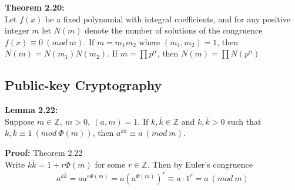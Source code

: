 \documentclass[a4paper]{article}
\begin{document}
\textbf{Theorem 2.20:}\\
Let $f(x)$ be a fixed polynomial with integral coefficients, and for any positive integer $m$ let $N(m)$ denote the number of solutions of the congruence $f(x)\equiv0\ (mod\ m)$. If $m=m_1m_2$ where $(m_1,m_2)=1$, then $N(m)=N(m_1)N(m_2)$. If $m=\prod p^\alpha$, then $N(m)=\prod N(p^\alpha)$

\subsection{Public-key Cryptography}

\textbf{Lemma 2.22:}\\
Suppose $m\in\mathbb{Z},\ m>0,\ (a,m)=1$. If $k,\overline{k}\in\mathbb{Z}$ and $k,\overline{k}>0$ such that $k,\overline{k}\equiv1\ (mod\ \Phi(m))$, then $a^{k\overline{k}}\equiv a\ (mod\ m)$.

\textbf{Proof:} Theorem 2.22\\
Write $k\overline{k}=1+r\Phi(m)$ for some $r\in\mathbb{Z}$. Then by Euler's congruence
\begin{align*}
    a^{k\overline{k}} = aa^{r\Phi(m)} = a(a^{\Phi(m)})^r \equiv a\cdot1^r = a\ (mod\ m)
\end{align*}
\end{document}
